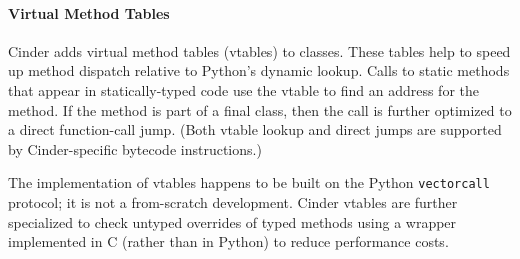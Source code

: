 \documentclass[english,cleveref,submission]{programming}
\newcommand{\code}[1]{\texttt{#1}}
\begin{document}



\paragraph{Virtual Method Tables}
\label{s:vtable}


Cinder adds virtual method tables (vtables) to classes.
These tables help to speed up method dispatch relative to Python's
dynamic lookup.
Calls to static methods that appear in statically-typed
code use the vtable to find an address for the method.
If the method is part of a final class, then the call is further optimized
to a direct function-call jump.
(Both vtable lookup and direct jumps are supported by Cinder-specific bytecode
instructions.)

The implementation of vtables happens to be built on the Python \code{vectorcall}
protocol; it is not a from-scratch development.
Cinder vtables are further specialized to check untyped overrides of typed methods
using a wrapper implemented in C (rather than in Python) to reduce performance costs.
\end{document}
